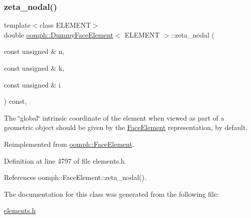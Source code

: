 \subsubsection{\texorpdfstring{zeta\+\_\+nodal()}{zeta\_nodal()}}
{\footnotesize\ttfamily template$<$class E\+L\+E\+M\+E\+NT$>$ \\
double \hyperlink{classoomph_1_1DummyFaceElement}{oomph\+::\+Dummy\+Face\+Element}$<$ E\+L\+E\+M\+E\+NT $>$\+::zeta\+\_\+nodal (\begin{DoxyParamCaption}\item[{const unsigned \&}]{n,  }\item[{const unsigned \&}]{k,  }\item[{const unsigned \&}]{i }\end{DoxyParamCaption}) const\hspace{0.3cm}{\ttfamily [inline]}, {\ttfamily [virtual]}}



The \char`\"{}global\char`\"{} intrinsic coordinate of the element when viewed as part of a geometric object should be given by the \hyperlink{classoomph_1_1FaceElement}{Face\+Element} representation, by default. 



Reimplemented from \hyperlink{classoomph_1_1FaceElement_a58c9f93705c7741f76c8487d152e68a6}{oomph\+::\+Face\+Element}.



Definition at line 4797 of file elements.\+h.



References oomph\+::\+Face\+Element\+::zeta\+\_\+nodal().



The documentation for this class was generated from the following file\+:\begin{DoxyCompactItemize}
\item 
\hyperlink{elements_8h}{elements.\+h}\end{DoxyCompactItemize}
